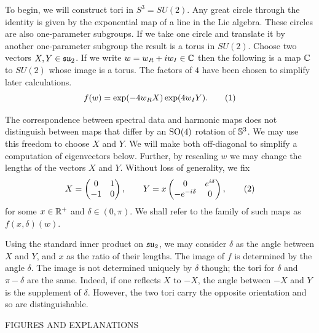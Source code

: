 \documentclass{article}
\begin{document}
To begin, we will construct tori in $S^3 = SU(2)$. Any great circle through the identity is given by the exponential map of a line in the Lie algebra. These circles are also one-parameter subgroups. If we take one circle and translate it by another one-parameter subgroup the result is a torus in $SU(2)$. Choose two vectors $X,Y\in \su_2$. If we write $w = w_R + \iu w_I \in \C$ then the following is a map $\C$ to $SU(2)$ whose image is a torus. The factors of $4$ have been chosen to simplify later calculations. 
\[
f(w) = \exp( -4 w_R X ) \exp( 4 w_I Y ).
\labelthis{eqn:genus zero simple map}
\]

The correspondence between spectral data and harmonic maps does not distinguish between maps that differ by an $\SO(4)$ rotation of $\S^3$. We may use this freedom to choose $X$ and $Y$. We will make both off-diagonal to simplify a computation of eigenvectors below. Further, by rescaling $w$ we may change the lengths of the vectors $X$ and $Y$. Without loss of generality, we fix 
\[
X = \begin{pmatrix}
0 & 1 \\ -1 & 0
\end{pmatrix}, \qquad
Y = x\begin{pmatrix}
0 & e^{\iu \delta} \\ -e^{-\iu \delta} & 0
\end{pmatrix},
\labelthis{eqn:def delta}
\]
for some $x \in \R^+$ and $\delta\in (0,\pi)$. We shall refer to the family of such maps as $f(x,\delta)(w)$.


Using the standard inner product on $\su_2$, we may consider $\delta$ as the angle between $X$ and $Y$, and $x$ as the ratio of their lengths. The image of $f$ is determined by the angle $\delta$. The image is not determined uniquely by $\delta$ though; the tori for $\delta$ and $\pi-\delta$ are the same. Indeed, if one reflects $X$ to $-X$, the angle between $-X$ and $Y$ is the supplement of $\delta$. However, the two tori carry the opposite orientation and so are distinguishable.

FIGURES AND EXPLANATIONS 
\end{document}
